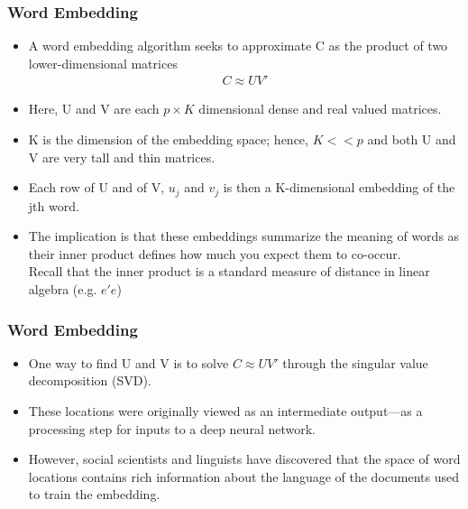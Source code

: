\documentclass[
  shownotes,
  xcolor={svgnames},
  hyperref={colorlinks,citecolor=DarkBlue,linkcolor=DarkRed,urlcolor=DarkBlue}
  , aspectratio=169]{beamer}
\begin{document}
\begin{frame}
\frametitle{Word Embedding }

\begin{itemize}
  \item A word embedding algorithm seeks to approximate C as the product of two lower-dimensional matrices
  \begin{align}
  C\approx UV'
  \end{align}

  \item Here, U and V are each $p \times K$ dimensional dense and real valued matrices. 
  \item K is the dimension of the embedding space; hence, $K < < p$ and both U and V are very tall and thin matrices. 
  \item Each row of U and of V, $u_j$ and $v_j$ is then a K-dimensional embedding of the jth word. 
  \item The implication is  that these embeddings summarize the meaning of words as their inner product defines how much you expect them to co-occur. 
  \\
  {\footnotesize Recall that the inner product is a standard measure of distance in linear algebra (e.g. $e'e$)}

  
\end{itemize}

 
\end{frame}
\begin{frame}
\frametitle{Word Embedding }

\begin{itemize}
  \item One way to find U and V is to solve $C\approx UV'$ through the singular value decomposition (SVD).
  \medskip

 \item These locations were originally viewed as an intermediate output—as a processing step for inputs to a deep neural network.
 \medskip
\item However, social scientists and linguists have discovered that the space of word locations contains rich information about the language of the documents used to train the embedding. 
\end{itemize}
\end{frame}
\end{document}
